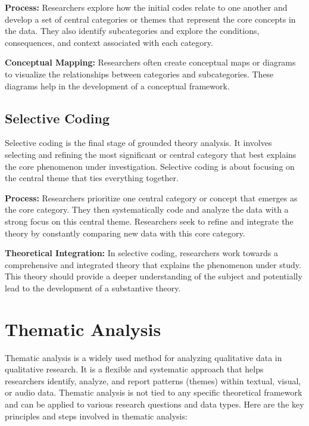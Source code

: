 \documentclass[
  b5paper]{book}
\begin{document}
\textbf{Process:} Researchers explore how the initial codes relate to one another and develop a set of central categories or themes that represent the core concepts in the data. They also identify subcategories and explore the conditions, consequences, and context associated with each category.

\textbf{Conceptual Mapping:} Researchers often create conceptual maps or diagrams to visualize the relationships between categories and subcategories. These diagrams help in the development of a conceptual framework.

\hypertarget{selective-coding}{%
\subsection*{Selective Coding}\label{selective-coding}}

Selective coding is the final stage of grounded theory analysis. It involves selecting and refining the most significant or central category that best explains the core phenomenon under investigation. Selective coding is about focusing on the central theme that ties everything together.

\textbf{Process:} Researchers prioritize one central category or concept that emerges as the core category. They then systematically code and analyze the data with a strong focus on this central theme. Researchers seek to refine and integrate the theory by constantly comparing new data with this core category.

\textbf{Theoretical Integration:} In selective coding, researchers work towards a comprehensive and integrated theory that explains the phenomenon under study. This theory should provide a deeper understanding of the subject and potentially lead to the development of a substantive theory.

\hypertarget{thematic-analysis}{%
\section{Thematic Analysis}\label{thematic-analysis}}

Thematic analysis is a widely used method for analyzing qualitative data in qualitative research. It is a flexible and systematic approach that helps researchers identify, analyze, and report patterns (themes) within textual, visual, or audio data. Thematic analysis is not tied to any specific theoretical framework and can be applied to various research questions and data types. Here are the key principles and steps involved in thematic analysis:
\end{document}
